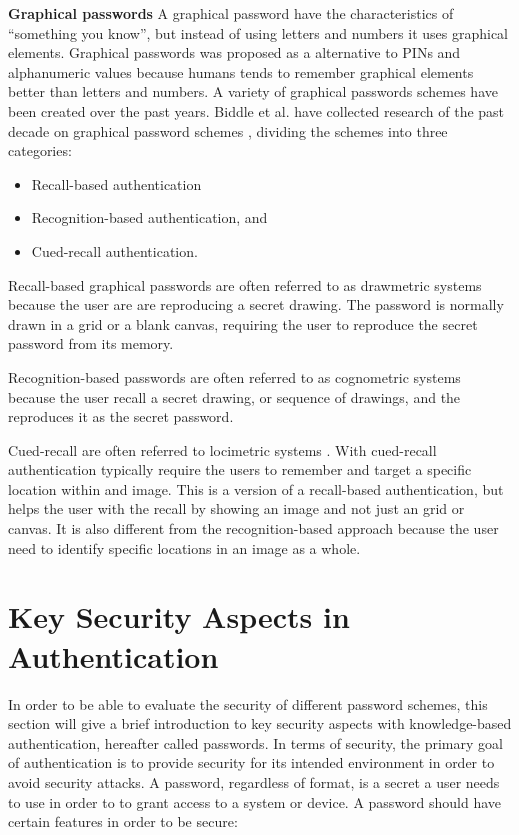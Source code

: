       {\bf Graphical passwords}
      A graphical password have the characteristics of ``something you know'', but instead of using letters and numbers it uses graphical elements. Graphical passwords was proposed as a alternative to PINs and alphanumeric values because humans tends to remember graphical elements better than letters and numbers. A variety of graphical passwords schemes have been created over the past years. Biddle et al. have collected research of the past decade on graphical password schemes \cite{Biddle}, dividing the schemes into three categories: 

      \begin{itemize}
        \item Recall-based authentication
        \item Recognition-based authentication, and 
        \item Cued-recall authentication.
      \end{itemize}

      Recall-based graphical passwords are often referred to as drawmetric systems \cite{DeAngeli} because the user are are reproducing a secret drawing. The password is normally drawn in a grid or a blank canvas, requiring the user to reproduce the secret password from its memory.

      Recognition-based passwords are often referred to as cognometric systems \cite{DeAngeli} because the user recall a secret drawing, or sequence of drawings, and the reproduces it as the secret password.

      Cued-recall are often referred to locimetric systems \cite{DeAngeli}. With cued-recall authentication typically require the users to remember and target a specific location within and image. This is a version of a recall-based authentication, but helps the user with the recall by showing an image and not just an grid or canvas. It is also different from the recognition-based approach because the user need to identify specific locations in an image as a whole. 

  \section{Key Security Aspects in Authentication} \label{sec:entropy}
  In order to be able to evaluate the security of different password schemes, this section will give a brief introduction to key security aspects with knowledge-based authentication, hereafter called passwords. In terms of security, the primary goal of authentication is to provide security for its intended environment in order to avoid security attacks. A password, regardless of format, is a secret a user needs to use in order to to grant access to a system or device. A password should have certain features in order to be secure:

